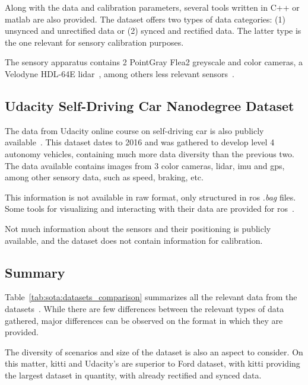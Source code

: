 Along with the data and calibration parameters, several tools written in C++ or \ac{matlab} are also provided. The dataset offers two types of data categories: (1) unsynced and unrectified data or (2) synced and rectified data. The latter type is the one relevant for sensory calibration purposes.

The sensory apparatus contains 2 PointGray Flea2 greyscale and color cameras, a Velodyne HDL-64E \ac{lidar}~\cite{VelodyneHDL64}, among others less relevant sensors~\cite{Geiger2013a}.

\subsection{Udacity Self-Driving Car Nanodegree Dataset}
The data from Udacity online course on self-driving car is also publicly available~\cite{udacity}. This dataset dates to 2016 and was gathered to develop level 4 autonomy vehicles, containing much more data diversity than the previous two. The data available contains images from 3 color cameras,  \ac{lidar}, \ac{imu} and \ac{gps}, among other sensory data, such as speed, braking, etc.

This information is not available in raw format, only structured in \ac{ros} \textit{.bag} files. Some tools for visualizing and interacting with their data are provided for \ac{ros}~\cite{udacity}. 

Not much information about the sensors and their positioning is publicly available, and the dataset does not contain information for calibration.

\subsection{Summary}
Table~\ref{tab:sota:datasets_comparison} summarizes all the relevant data from the datasets~\cite{udacity, Pandey2011, Geiger2013a}. While there are few differences between the relevant types of data gathered, major differences can be observed on the format in which they are provided. 

The diversity of scenarios and size of the dataset is also an aspect to consider. On this matter, \ac{kitti} and Udacity's are superior to Ford dataset, with \ac{kitti} providing the largest dataset in quantity, with already rectified and synced data. 
	
